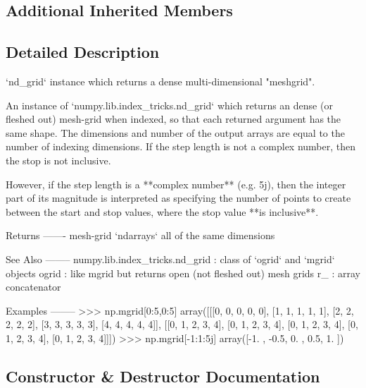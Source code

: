 \subsection*{Additional Inherited Members}


\subsection{Detailed Description}
\begin{DoxyVerb}`nd_grid` instance which returns a dense multi-dimensional "meshgrid".

An instance of `numpy.lib.index_tricks.nd_grid` which returns an dense
(or fleshed out) mesh-grid when indexed, so that each returned argument
has the same shape.  The dimensions and number of the output arrays are
equal to the number of indexing dimensions.  If the step length is not a
complex number, then the stop is not inclusive.

However, if the step length is a **complex number** (e.g. 5j), then
the integer part of its magnitude is interpreted as specifying the
number of points to create between the start and stop values, where
the stop value **is inclusive**.

Returns
-------
mesh-grid `ndarrays` all of the same dimensions

See Also
--------
numpy.lib.index_tricks.nd_grid : class of `ogrid` and `mgrid` objects
ogrid : like mgrid but returns open (not fleshed out) mesh grids
r_ : array concatenator

Examples
--------
>>> np.mgrid[0:5,0:5]
array([[[0, 0, 0, 0, 0],
        [1, 1, 1, 1, 1],
        [2, 2, 2, 2, 2],
        [3, 3, 3, 3, 3],
        [4, 4, 4, 4, 4]],
       [[0, 1, 2, 3, 4],
        [0, 1, 2, 3, 4],
        [0, 1, 2, 3, 4],
        [0, 1, 2, 3, 4],
        [0, 1, 2, 3, 4]]])
>>> np.mgrid[-1:1:5j]
array([-1. , -0.5,  0. ,  0.5,  1. ])\end{DoxyVerb}
 

\subsection{Constructor \& Destructor Documentation}
\mbox{\label{classnumpy_1_1lib_1_1index__tricks_1_1MGridClass_adfcb1a11c90df28525beb376948fdef1}} 
